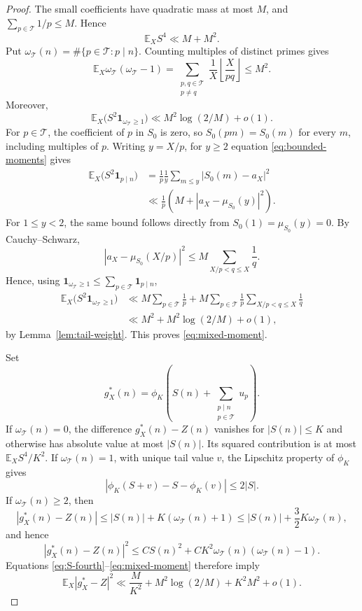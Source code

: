 \documentclass[11pt]{article}
\numberwithin{equation}{section}
\newcommand{\E}{\mathbb E}
\newcommand{\ind}{\mathbf 1}
\newcommand{\clip}{\phi_K}
\begin{document}
\begin{proof}
The small coefficients have quadratic mass at most $M$, and
$\sum_{p\in\mathcal T}1/p\le M$. Hence
\begin{equation}\label{eq:S-fourth}
 \E_X S^4\ll M+M^2.
\end{equation}
Put $\omega_{\mathcal T}(n)=\#\{p\in\mathcal T:p\mid n\}$. Counting multiples of
distinct primes gives
\begin{equation}\label{eq:tail-count}
 \E_X\omega_{\mathcal T}(\omega_{\mathcal T}-1)
 =\sum_{\substack{p,q\in\mathcal T\\p\ne q}}
       \frac1X\left\lfloor\frac X{pq}\right\rfloor
 \le M^2.
\end{equation}
Moreover,
\begin{equation}\label{eq:mixed-moment}
 \E_X\bigl(S^2\ind_{\omega_{\mathcal T}\ge1}\bigr)
 \ll M^2\log(2/M)+o(1).
\end{equation}
For $p\in\mathcal T$, the coefficient of $p$ in $S_0$ is zero,
so $S_0(pm)=S_0(m)$ for every $m$, including multiples of $p$.
Writing $y=X/p$, for $y\ge2$ equation \eqref{eq:bounded-moments} gives
\begin{align*}
 \E_X\bigl(S^2\ind_{p\mid n}\bigr)
 &=\frac1p\frac1y\sum_{m\le y}|S_0(m)-a_X|^2\\
 &\ll\frac1p\left(M+
           |a_X-\mu_{S_0}(y)|^2\right).
\end{align*}
For $1\le y<2$, the same bound follows directly from
$S_0(1)=\mu_{S_0}(y)=0$. By Cauchy--Schwarz,
\[
 |a_X-\mu_{S_0}(X/p)|^2
 \le M\sum_{X/p<q\le X}\frac1q.
\]
Hence, using $\ind_{\omega_{\mathcal T}\ge1}\le\sum_{p\in\mathcal T}\ind_{p\mid n}$,
\begin{align*}
 \E_X\bigl(S^2\ind_{\omega_{\mathcal T}\ge1}\bigr)
 &\ll M\sum_{p\in\mathcal T}\frac1p
 +M\sum_{p\in\mathcal T}\frac1p
       \sum_{X/p<q\le X}\frac1q\\
 &\ll M^2+M^2\log(2/M)+o(1),
\end{align*}
by Lemma~\ref{lem:tail-weight}. This proves \eqref{eq:mixed-moment}.

Set
\[
 g_X^*(n)=\clip\left(S(n)+
                  \sum_{\substack{p\mid n\\p\in\mathcal T}}u_p\right).
\]
If $\omega_{\mathcal T}(n)=0$, the difference $g_X^*(n)-Z(n)$ vanishes for $|S(n)|\le K$
and otherwise has absolute value at most $|S(n)|$. Its squared
contribution is at most $\E_X S^4/K^2$.
If $\omega_{\mathcal T}(n)=1$, with unique tail value $v$, the Lipschitz property of
$\clip$ gives
\[
 |\clip(S+v)-S-\clip(v)|\le2|S|.
\]
If $\omega_{\mathcal T}(n)\ge2$, then
\[
 |g_X^*(n)-Z(n)|\le |S(n)|+K(\omega_{\mathcal T}(n)+1)
 \le |S(n)|+\frac32K\omega_{\mathcal T}(n),
\]
and hence
\[
 |g_X^*(n)-Z(n)|^2\le C S(n)^2+
 C K^2\omega_{\mathcal T}(n)(\omega_{\mathcal T}(n)-1).
\]
Equations \eqref{eq:S-fourth}--\eqref{eq:mixed-moment} therefore imply
\begin{equation}\label{eq:strong-clipping}
 \E_X|g_X^*-Z|^2
 \ll\frac M{K^2}+M^2\log(2/M)+K^2M^2+o(1).
\end{equation}


\end{proof}
\end{document}
